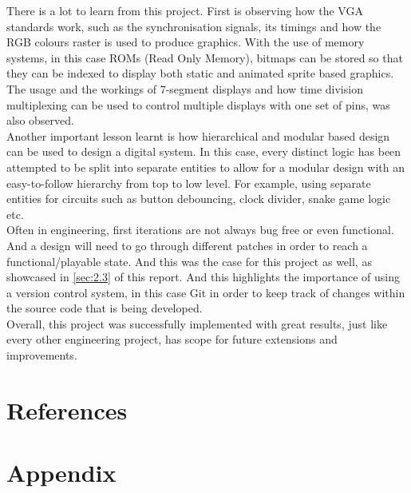 \documentclass[aps, secnumarabic, balancelastpage, asmath, amssymb, nofootinbib, floatfix,]{revtex4-2}
\begin{document}
{There is a lot to learn from this project. First is observing how the VGA standards work, such as the synchronisation signals, its timings and how the RGB colours raster is used to produce graphics. With the use of memory systems, in this case ROMs (Read Only Memory), bitmaps can be stored so that they can be indexed to display both static and animated sprite based graphics. The usage and the workings of 7-segment displays and how time division multiplexing can be used to control multiple displays with one set of pins, was also observed. ~\\


Another important lesson learnt is how hierarchical and modular based design can be used to design a digital system. In this case, every distinct logic has been attempted to be split into separate entities to allow for a modular design with an easy-to-follow hierarchy from top to low level. For example, using separate entities for circuits such as button debouncing, clock divider, snake game logic etc.~\\


Often in engineering, first iterations are not always bug free or even functional. And a design will need to go through different patches in order to reach a functional/playable state. And this was the case for this project as well, as showcased in \ref{sec:2.3} of this report. And this highlights the importance of using a version control system, in this case Git in order to keep track of changes within the source code that is being developed.~\\

Overall, this project was successfully implemented with great results, just like every other engineering project, has scope for future extensions and improvements.


\clearpage


\section{\fontsize{11.3pt}{12pt}\selectfont \bf References}
\fontsize{11pt}{12pt}\selectfont \label{sec:5}



\clearpage


\section{\fontsize{11.3pt}{12pt}\selectfont \bf Appendix}
\fontsize{11pt}{12pt}\selectfont \label{sec:app}


}
\end{document}
